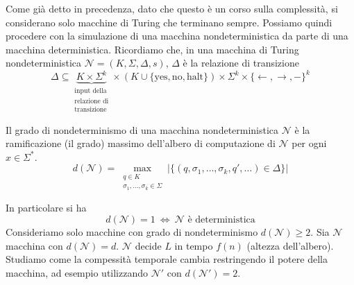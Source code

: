 Come già detto in precedenza, dato che questo è un corso sulla complessità, si considerano solo macchine di Turing che terminano sempre. Possiamo quindi procedere con la simulazione di una macchina non\-de\-ter\-ministica da parte di una macchina deterministica. Ricordiamo che, in una macchina di Turing nondeterministica $\mathcal{N}=(K,\Sigma,\Delta,s)$, $\Delta$ è la relazione di transizione
$$
    \Delta \subseteq \underbrace{K\times\Sigma^k}_{\substack{\text{input della}\\\text{relazione di}\\\text{transizione}}}\times (K\cup\{\text{yes},\text{no},\text{halt}\}) \times \Sigma^k \times \{\gets,\to,-\}^k
$$
\begin{definition}
    Il grado di nondeterminismo di una macchina nondeterministica $\mathcal{N}$ è la ramificazione (il grado) massimo dell'albero di computazione di $\mathcal{N}$ per ogni $x\in\Sigma^*$.
    $$
        d(\mathcal{N}) = 
        \max_{\substack{q\in K\\\sigma_1,\dots,\sigma_k\in\Sigma}} 
        |\{ (q, \sigma_1, \dots, \sigma_k, q',\dots)\in\Delta \}|
    $$
\end{definition}
In particolare si ha
$$
    d(\mathcal{N})=1 ~\Leftrightarrow~ \mathcal{N} \text{ è deterministica}
$$
Consideriamo solo macchine con grado di nondeterminismo $d(\mathcal{N})\geq 2$. Sia $\mathcal{N}$ macchina con $d(\mathcal{N})=d$. $\mathcal{N}$ decide $L$ in tempo $f(n)$ (altezza dell'albero). Studiamo come la compessità temporale cambia restringendo il potere della macchina, ad esempio utilizzando $\mathcal{N}'$ con $d(\mathcal{N}')=2$.
